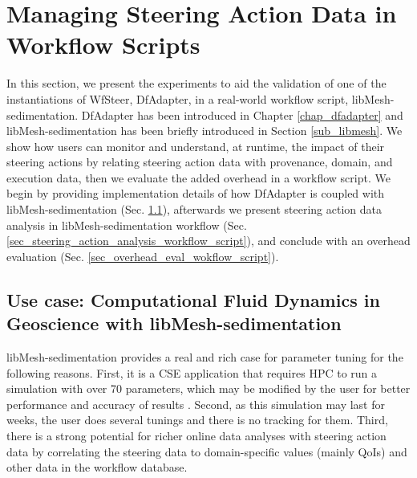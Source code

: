 \section{Managing Steering Action Data in Workflow Scripts}
\label{sec_exps_wfscripts}

In this section, we present the experiments to aid the validation of one of the instantiations of WfSteer,
DfAdapter, in a real-world workflow script, libMesh-sedimentation.
DfAdapter has been introduced in Chapter \ref{chap_dfadapter} and libMesh-sedimentation has been briefly introduced in Section \ref{sub_libmesh}.
We show how users can monitor and understand, at runtime, the impact of their steering actions by relating steering action data with
provenance, domain, and execution data, then we evaluate the added overhead in a workflow script.
We begin by providing implementation details of how DfAdapter is coupled with libMesh-sedimentation (Sec. \ref{subsec_libmesh_exp_use_case}),
afterwards we present steering action data analysis in libMesh-sedimentation workflow (Sec. \ref{sec_steering_action_analysis_workflow_script}), and
conclude with an overhead evaluation (Sec. \ref{sec_overhead_eval_wokflow_script}).



\subsection{Use case: Computational Fluid Dynamics in Geoscience with libMesh-sedimentation}
\label{subsec_libmesh_exp_use_case}

libMesh-sedimentation provides a real and rich case for parameter tuning for the following reasons. First, it is a CSE application that requires HPC to run a simulation with over 70 parameters, which may be modified by the user for better performance and accuracy of results \cite{Camata2018In}. Second, as this simulation may last for weeks, the user does several tunings and there is no tracking for them. Third, there is a strong potential for richer online data analyses with steering action data by correlating the steering data to domain-specific values (mainly QoIs) and other data in the workflow database.

